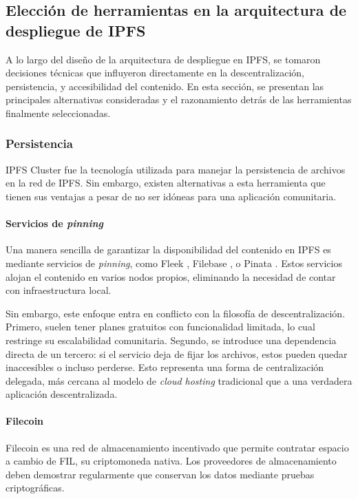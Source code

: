 \subsection{Elección de herramientas en la arquitectura de despliegue de IPFS}

A lo largo del diseño de la arquitectura de despliegue en IPFS, se tomaron decisiones técnicas que influyeron directamente en la descentralización, persistencia, y accesibilidad del contenido. En esta sección, se presentan las principales alternativas consideradas y el razonamiento detrás de las herramientas finalmente seleccionadas.

\subsubsection{Persistencia}

IPFS Cluster fue la tecnología utilizada para manejar la persistencia de archivos en la red de IPFS. Sin embargo, existen alternativas a esta herramienta que tienen sus ventajas a pesar de no ser idóneas para una aplicación comunitaria.

\paragraph{Servicios de \textit{pinning}}
Una manera sencilla de garantizar la disponibilidad del contenido en IPFS es mediante servicios de \textit{pinning}, como Fleek \cite{fleek}, Filebase \cite{filebase}, o Pinata \cite{pinata}. Estos servicios alojan el contenido en varios nodos propios, eliminando la necesidad de contar con infraestructura local.

Sin embargo, este enfoque entra en conflicto con la filosofía de descentralización. Primero, suelen tener planes gratuitos con funcionalidad limitada, lo cual restringe su escalabilidad comunitaria. Segundo, se introduce una dependencia directa de un tercero: si el servicio deja de fijar los archivos, estos pueden quedar inaccesibles o incluso perderse. Esto representa una forma de centralización delegada, más cercana al modelo de \textit{cloud hosting} tradicional que a una verdadera aplicación descentralizada.

\paragraph{Filecoin}
Filecoin \cite{filecoin} es una red de almacenamiento incentivado que permite contratar espacio a cambio de FIL, su criptomoneda nativa. Los proveedores de almacenamiento deben demostrar regularmente que conservan los datos mediante pruebas criptográficas.

